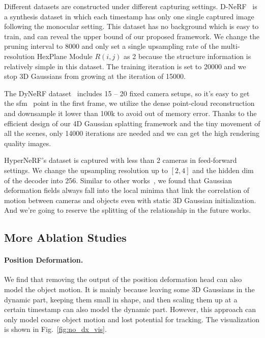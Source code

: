 Different datasets are constructed under different capturing settings. D-NeRF~\cite{pumarola2021dnerf} is a synthesis dataset in which each timestamp has only one single captured image following the monocular setting. This dataset has no background which is easy to train, and can reveal the upper bound of our proposed framework. We change the pruning interval to 8000 and only set a single upsampling rate of the multi-resolution HexPlane Module $R(i,j)$ as 2 because the structure information is relatively simple in this dataset. The training iteration is set to 20000 and we stop 3D Gaussians from growing at the iteration of 15000.

The DyNeRF dataset~\cite{li2022neural} includes 15 -- 20 fixed camera setups, so it's easy to get the sfm~\cite{schonberger2016structurefrommotion} point in the first frame, we utilize the dense point-cloud reconstruction and downsample it lower than 100k to avoid out of memory error. Thanks to the efficient design of our 4D Gaussian splatting framework and the tiny movement of all the scenes, only 14000 iterations are needed and we can get the high rendering quality images. 

HyperNeRF's dataset is captured with less than 2 cameras in feed-forward settings. We change the upsampling resolution up to $[2,4]$ and the hidden dim of the decoder into 256. Similar to other works~\cite{tineuvox,park2021hypernerf}, we found that Gaussian deformation fields always fall into the local minima that link the correlation of motion between cameras and objects even with static 3D Gaussian initialization. And we're going to reserve the splitting of the relationship in the future works. 

\subsection{More Ablation Studies}
\label{Supsec:ablationstudies}
\paragraph{Position Deformation.} We find that removing the output of the position deformation head can also model the object motion. It is mainly because leaving some 3D Gaussians in the dynamic part, keeping them small in shape, and then scaling them up at a certain timestamp can also model the dynamic part. However, this approach can only model coarse object motion and lost potential for tracking. The visualization is shown in Fig.~\ref{fig:no_dx_vis}.
